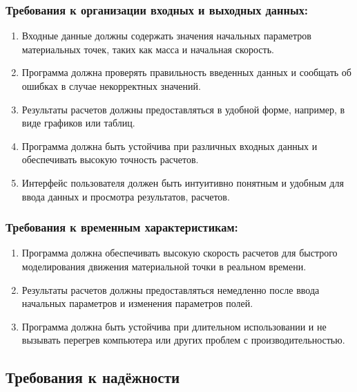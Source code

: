  \subsubsection{Требования к организации входных и выходных данных:}

 \begin{enumerate}
  \item Входные данные должны содержать значения начальных параметров материальных точек, таких как масса и начальная скорость.
  \item Программа должна проверять правильность введенных данных и сообщать об ошибках в случае некорректных значений.
  \item Результаты расчетов должны предоставляться в удобной форме, например, в виде графиков или таблиц.
  \item Программа должна быть устойчива при различных входных данных и обеспечивать высокую точность расчетов.
  \item Интерфейс пользователя должен быть интуитивно понятным и удобным для ввода данных и просмотра результатов, расчетов.
 \end{enumerate}

 \subsubsection{Требования к временным характеристикам:}

 \begin{enumerate}
  \item Программа должна обеспечивать высокую скорость расчетов для быстрого моделирования движения материальной точки в реальном времени.
  \item Результаты расчетов должны предоставляться немедленно после ввода начальных параметров и изменения параметров полей.
  \item Программа должна быть устойчива при длительном использовании и не вызывать перегрев компьютера или других проблем с производительностью.
 \end{enumerate}

 \subsection{Требования к надёжности}
